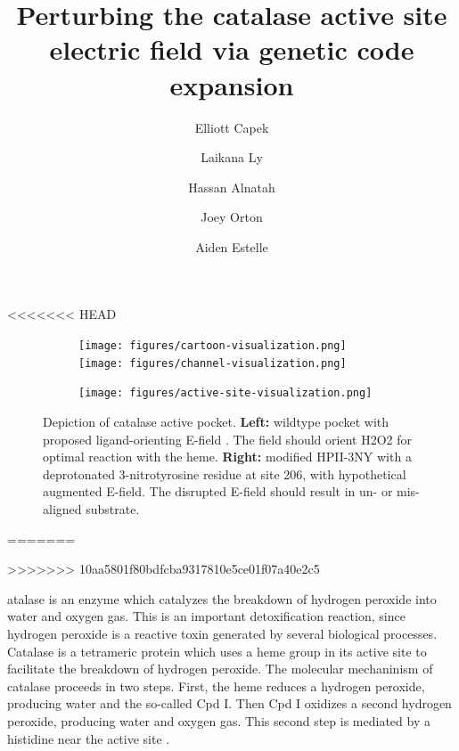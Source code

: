 \documentclass[9pt,twocolumn,twoside]{pnas-new}
\title{Perturbing the catalase active site electric field via genetic code expansion}
\author[a,1,2]{Elliott Capek}
\author[a]{Laikana Ly}
\author[a]{Hassan Alnatah}
\author[a]{Joey Orton}
\author[a]{Aiden Estelle}
\affil[a]{Oregon State University Department of Biohchemistry and Biophysics}
\begin{document}
\verticaladjustment{-2pt}

<<<<<<< HEAD
\begin{figure}
  \begin{subfigure}{0.69\textwidth}
    \begin{minipage}{0.1\textwidth}\caption{}\end{minipage}%
    \begin{minipage}{.9\textwidth}
      \texttt{[image: figures/cartoon-visualization.png]}%
      \texttt{[image: figures/channel-visualization.png]}
    \end{minipage}
  \end{subfigure}
  \begin{subfigure}{0.3\textwidth}
    \begin{minipage}{0.1\textwidth}\caption{}\end{minipage}%
    \begin{minipage}{.9\textwidth}
      \texttt{[image: figures/active-site-visualization.png]}%
    \end{minipage}
  \end{subfigure}
  
  \caption{Depiction of catalase active pocket. \textbf{Left:} wildtype pocket with proposed ligand-orienting E-field \cite{electricpotential}. The field should orient H2O2 for optimal reaction with the heme. \textbf{Right:} modified HPII-3NY with a deprotonated 3-nitrotyrosine residue at site 206, with hypothetical augmented E-field. The disrupted E-field should result in un- or mis-aligned substrate.}
  \label{fig:hypothesis}
\end{figure}
=======
\maketitle
\thispagestyle{firststyle}
>>>>>>> 10aa5801f80bdfcba9317810e5ce01f07a40e2c5

atalase is an enzyme which catalyzes the breakdown of hydrogen peroxide into water and oxygen gas. This is an important detoxification reaction, since hydrogen peroxide is a reactive toxin generated by several biological processes. Catalase is a tetrameric protein which uses a heme group in its active site to facilitate the breakdown of hydrogen peroxide. The molecular mechaninism of catalase proceeds in two steps. First, the heme reduces a hydrogen peroxide, producing water and the so-called Cpd I. Then Cpd I oxidizes a second hydrogen peroxide, producing water and oxygen gas. This second step is mediated by a histidine near the active site \cite{alfonso-prieto}.\\
\end{document}
